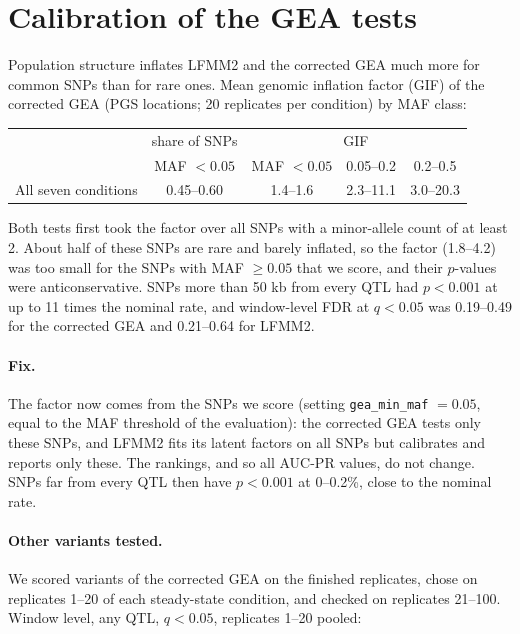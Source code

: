 \section{Calibration of the GEA tests}
\label{sec:calibration}

Population structure inflates LFMM2 and the corrected GEA much more for
common SNPs than for rare ones. Mean genomic inflation factor (GIF) of the
corrected GEA (PGS locations; 20 replicates per condition) by MAF class:

\begin{center}
\begin{tabular}{lcccc}
\toprule
 & share of SNPs & \multicolumn{3}{c}{GIF} \\
 & MAF $<0.05$ & MAF $<0.05$ & 0.05--0.2 & 0.2--0.5 \\
\midrule
All seven conditions & 0.45--0.60 & 1.4--1.6 & 2.3--11.1 & 3.0--20.3 \\
\bottomrule
\end{tabular}
\end{center}

\noindent Both tests first took the factor over all SNPs with a
minor-allele count of at least 2. About half of these SNPs are rare and
barely inflated, so the factor (1.8--4.2) was too small for the SNPs with
MAF $\geq 0.05$ that we score, and their $p$-values were anticonservative.
SNPs more than 50 kb from every QTL had $p<0.001$ at up to 11 times the
nominal rate, and window-level FDR at $q<0.05$ was 0.19--0.49 for the
corrected GEA and 0.21--0.64 for LFMM2.

\paragraph{Fix.} The factor now comes from the SNPs we score (setting
\texttt{gea\_min\_maf} $=0.05$, equal to the MAF threshold of the
evaluation): the corrected GEA tests only these SNPs, and LFMM2 fits its
latent factors on all SNPs but calibrates and reports only these. The
rankings, and so all AUC-PR values, do not change. SNPs far from every QTL
then have $p<0.001$ at 0--0.2\%, close to the nominal rate.

\paragraph{Other variants tested.} We scored variants of the corrected GEA
on the finished replicates, chose on replicates 1--20 of each
steady-state condition, and checked on replicates 21--100.
Window level, any QTL, $q<0.05$, replicates 1--20 pooled:

